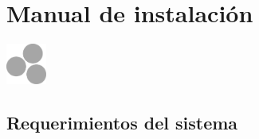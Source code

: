 	\titleformat{\chapter}[hang]
	{\normalfont\bfseries}{\chaptertitlename\ \thechapter:}{1em}{}
	\makeatletter
	\def\ttl@mkchap@i#1#2#3#4#5#6#7{%
    \ttl@assign\@tempskipa#3\relax\beforetitleunit
    \vspace{\@tempskipa}%
    \global\@afterindenttrue
    \ifcase#5 \global\@afterindentfalse\fi
    \ttl@assign\@tempskipb#4\relax\aftertitleunit
    \ttl@topmode{\@tempskipb}{%
        \ttl@select{#6}{#1}{#2}{#7}}%
    \ttl@finmarks  %
    \@ifundefined{ttlp@#6}{}{\ttlp@write{#6}}}
    \makeatother

\appendix
\clearpage
\addappheadtotoc
\appendixpage

\chapter{Manual de instalaci\'{o}n}
\thispagestyle{fancy}

\begin{center}
	\includegraphics[width=0.10\textwidth]{./img/logo_gris.png}
\end{center}

\section*{Requerimientos del sistema}

